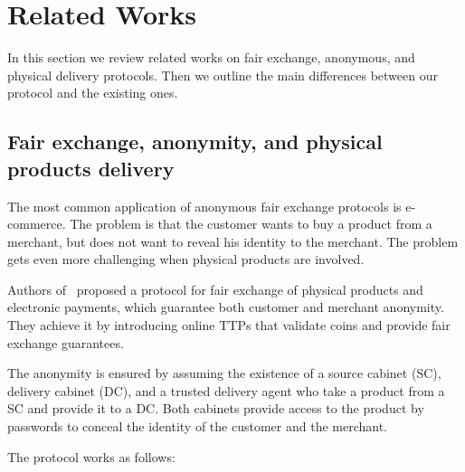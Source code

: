 \documentclass{ieeeaccess}
\begin{document}
\section{Related Works}\label{sec:related-works}
In this section we review related works on fair exchange, anonymous, and physical delivery protocols. Then we outline the main differences between our protocol and the existing ones.

\subsection{Fair exchange, anonymity, and physical products delivery} 
\label{anonymity-and-fair-exchange-in-e-commerce-protocol-for-physical-products-delivery}

The most common application of anonymous fair exchange protocols is e-commerce. The problem is that the customer wants to buy a product from a merchant, but does not want to reveal his identity to the merchant. The problem gets even more challenging when physical products are involved.

Authors of~\cite{birjoveanuAnonymityFairexchangeEcommerce2015} proposed a protocol for fair exchange of physical products and electronic payments, which guarantee both customer and merchant anonymity. They achieve it by introducing online TTPs that validate coins and provide fair exchange guarantees.

The anonymity is ensured by assuming the existence of a source cabinet (SC), delivery cabinet (DC), and a trusted delivery agent who take a product from a SC and provide it to a DC.
Both cabinets provide access to the product by passwords to conceal
the identity of the customer and the merchant.

The protocol works as follows: \begingroup
\renewcommand{\labelenumii}{\arabic{enumii}.}
\end{document}
